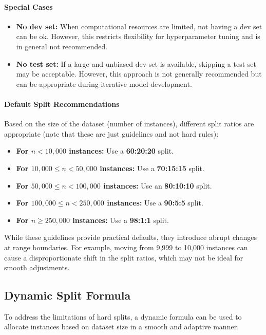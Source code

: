 \documentclass[12pt,openany]{book}
\begin{document}
\paragraph{Special Cases}
\begin{itemize}
    \item \textbf{No dev set:} When computational resources are limited, not having a dev set can be ok. However, this restricts flexibility for hyperparameter tuning and is in general not recommended.
    \item \textbf{No test set:} If a large and unbiased dev set is available, skipping a test set may be acceptable. However, this approach is not generally recommended but can be appropriate during iterative model development.
\end{itemize}

\paragraph{Default Split Recommendations}
Based on the size of the dataset (number of instances), different split ratios are appropriate (note that these are just guidelines and not hard rules):
\begin{itemize}
    \item \textbf{For $n < 10,000$ instances:} Use a \textbf{60:20:20} split.
    \item \textbf{For $10,000 \leq n < 50,000$ instances:} Use a \textbf{70:15:15} split.
    \item \textbf{For $50,000 \leq n < 100,000$ instances:} Use an \textbf{80:10:10} split.
    \item \textbf{For $100,000 \leq n < 250,000$ instances:} Use a \textbf{90:5:5} split.
    \item \textbf{For $n \geq 250,000$ instances:} Use a \textbf{98:1:1} split.
\end{itemize}

While these guidelines provide practical defaults, they introduce abrupt changes at range boundaries. For example, moving from 9,999 to 10,000 instances can cause a disproportionate shift in the split ratios, which may not be ideal for smooth adjustments.

\subsection{Dynamic Split Formula}

To address the limitations of hard splits, a dynamic formula can be used to allocate instances based on dataset size in a smooth and adaptive manner. 
\end{document}
